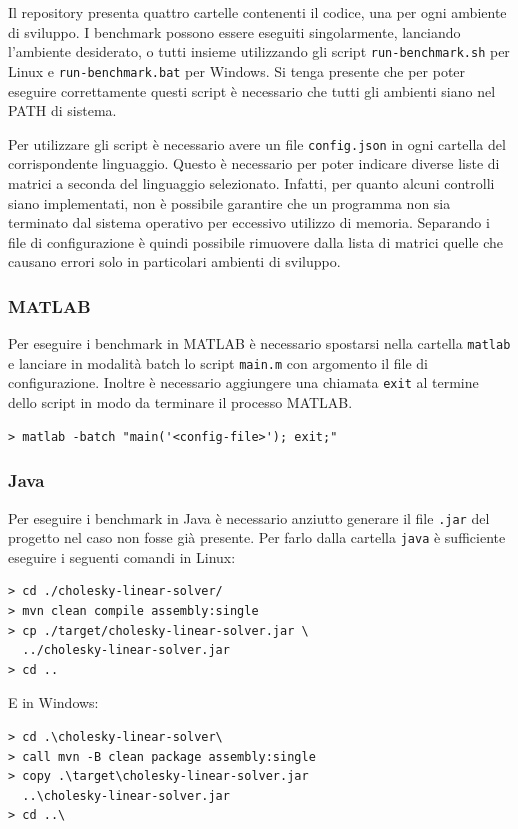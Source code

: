 \documentclass[a4paper, 12pt]{article}
\begin{document}
Il repository presenta quattro cartelle contenenti il codice, una per ogni
ambiente di sviluppo. I benchmark possono essere eseguiti singolarmente,
lanciando l'ambiente desiderato, o tutti insieme utilizzando gli script
\texttt{run-benchmark.sh} per Linux e \texttt{run-benchmark.bat} per Windows. Si
tenga presente che per poter eseguire correttamente questi script è necessario
che tutti gli ambienti siano nel PATH di sistema.

Per utilizzare gli script è necessario avere un file \texttt{config.json} in
ogni cartella del corrispondente linguaggio.
Questo è necessario per poter indicare diverse liste di matrici a seconda del
linguaggio selezionato. Infatti, per quanto alcuni controlli siano implementati,
non è possibile garantire che un programma non sia terminato dal sistema
operativo per eccessivo utilizzo di memoria. Separando i file di configurazione
è quindi possibile rimuovere dalla lista di matrici quelle che causano errori
solo in particolari ambienti di sviluppo.

\subsubsection{MATLAB}
Per eseguire i benchmark in MATLAB è necessario spostarsi nella cartella
\texttt{matlab} e lanciare in modalità batch lo script \texttt{main.m} con
argomento il file di configurazione. Inoltre è necessario aggiungere una
chiamata \texttt{exit} al termine dello script in modo da terminare il processo
MATLAB.
\begin{lstlisting}[frame=single]
> matlab -batch "main('<config-file>'); exit;"
\end{lstlisting}

\subsubsection{Java}
Per eseguire i benchmark in Java è necessario anziutto generare il file 
\texttt{.jar} del progetto nel caso non fosse già presente. Per farlo dalla 
cartella \texttt{java} è sufficiente eseguire i seguenti comandi in Linux:
\begin{lstlisting}[frame=single]
> cd ./cholesky-linear-solver/
> mvn clean compile assembly:single
> cp ./target/cholesky-linear-solver.jar \
  ../cholesky-linear-solver.jar
> cd ..
\end{lstlisting}

E in Windows:
\begin{lstlisting}[frame=single]
> cd .\cholesky-linear-solver\
> call mvn -B clean package assembly:single
> copy .\target\cholesky-linear-solver.jar 
  ..\cholesky-linear-solver.jar
> cd ..\
\end{lstlisting}
\end{document}
